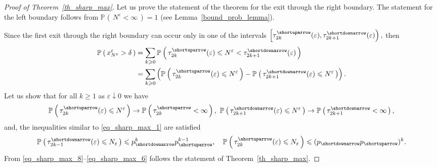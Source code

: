 \documentclass{article}
\theoremstyle{plain}
\theoremstyle{definition}
\theoremstyle{remark}
\newcommand{\p}[2][]{{\mathbb{P}}_{#1} \left( \, #2 \, \right) } %
\newcommand{\ra }{ \rightarrow} %
\begin{document}
\begin{proof}[Proof of Theorem~\ref{th_sharp_max}]
Let us prove the statement of the theorem for the exit through the right boundary. The statement for the left boundary follows from $\p{N^{\varepsilon} < \infty} = 1$ (see Lemma~\ref{bound_prob_lemma}). 

 Since the first exit through the right boundary can occur only in one of the intervals $\left[\tau_{2 k}^{\shortuparrow}(\varepsilon), \tau_{2k+1}^{\shortdownarrow}(\varepsilon)\right),$ then 
\begin{equation}\label{eq_sharp_max_8}
\begin{split}
\p{x_{N^{\varepsilon}}^{\varepsilon} > \delta} & = \sum_{k \geqslant 0} \p{\tau_{2 k}^{\shortuparrow}(\varepsilon) \leqslant N^{\varepsilon} < \tau_{2k+1}^{\shortdownarrow}(\varepsilon)} \\
& = \sum_{k \geqslant 0} \left( \p{\tau_{2 k}^{\shortuparrow}(\varepsilon) \leqslant N^{\varepsilon}}  - \p{ \tau_{2k+1}^{\shortdownarrow}(\varepsilon) \leqslant N^{\varepsilon}}\right).
\end{split}
\end{equation}
Let us show that for all $k \geq 1$ as $\varepsilon \downarrow 0$ we have
\begin{equation}\label{eq_sharp_max_7}
\p{\tau_{2 k}^{\shortuparrow}(\varepsilon) \leqslant N^{\varepsilon}} \ra \p{\tau_{2 k}^{\shortuparrow} < \infty}, \  \p{ \tau_{2k+1}^{\shortdownarrow}(\varepsilon) \leqslant N^{\varepsilon}} \ra \p{\tau_{2 k +1}^{\shortdownarrow} < \infty},
\end{equation}
and, the inequalities similar to \eqref{eq_sharp_max_1} are satisfied 
\begin{equation}\label{eq_sharp_max_6}
   \p{ \tau_{2 k-1}^{\shortdownarrow}(\varepsilon) \leqslant N_{\varepsilon}} \leqslant p_{\shortdownarrow}^k p_{\shortuparrow}^{k-1}, \quad \p{ \tau_{2 k}^{\shortuparrow}(\varepsilon) \leqslant N_{\varepsilon}} \leqslant (p_{\shortdownarrow} p_{\shortuparrow})^k.
\end{equation}
From \eqref{eq_sharp_max_8}--\eqref{eq_sharp_max_6} follows the statement of Theorem~\ref{th_sharp_max}.


\end{proof}
\end{document}
